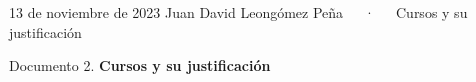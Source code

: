 \documentclass[11pt,a4paper,]{awesome-cv}
\begin{document}
\makecvheader

\makecvfooter
  {13 de noviembre de 2023}
    {Juan David Leongómez Peña~~~·~~~Cursos y su justificación}
  {\thepage}





\vspace{4mm}
\begin{tcolorbox}[enhanced,
        on line, 
        boxsep=4pt, left=0pt,right=0pt,top=0pt,bottom=0pt,
        colframe=white,colback=black]
  
\color{white}
\begin{LARGE}\begin{center}
Documento 2. \textbf{ Cursos y su justificación}
\end{center}\end{LARGE}
\end{tcolorbox}
\end{document}
